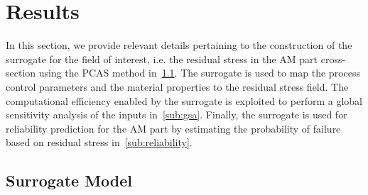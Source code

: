 \section{Results}
\label{sec:results}

In this section, we provide relevant details pertaining to the construction of the surrogate for the field of interest, i.e. the
residual stress in the AM part cross-section using the PCAS method in~\ref{sub:surr}. The surrogate is used to map
the process control parameters and the material properties to the residual stress field. The computational efficiency
enabled by the surrogate is exploited to perform a global sensitivity analysis of the inputs in~\ref{sub:gsa}. Finally, the
surrogate is used for reliability prediction for the AM part by estimating the probability of failure based on residual stress
in~\ref{sub:reliability}.

\subsection{Surrogate Model}
\label{sub:surr}

